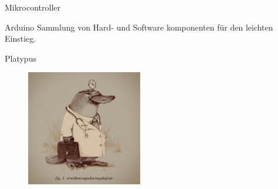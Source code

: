 \documentclass{beamer}
\begin{document}
\begin{frame}[fragile]{Mikrocontroller}
\begin{alertblock}{Arduino}
  Sammlung von Hard- und Software komponenten für den leichten Einstieg.
\end{alertblock}
\end{frame}

\begin{frame}[fragile]{Platypus}
  \begin{figure}[h]
    \centering
      \includegraphics[width=0.45\textwidth]{./platy.jpg}
  \end{figure}
\end{frame}
\end{document}
